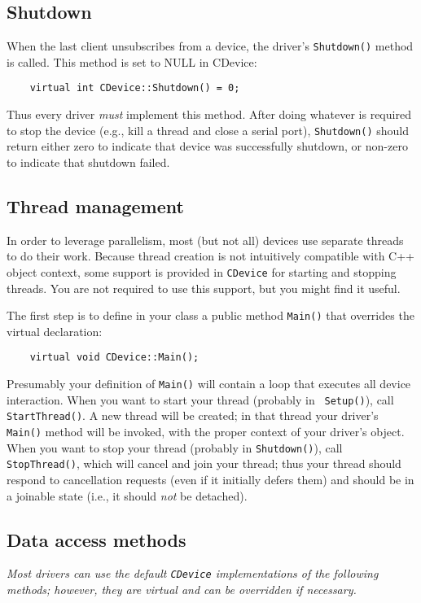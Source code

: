 \documentclass[11pt]{report}
\begin{document}
\subsection{Shutdown}
When the last client unsubscribes from a device, the driver's 
{\tt Shutdown()} method is called.  This method is set to NULL in CDevice:
\begin{verbatim}
    virtual int CDevice::Shutdown() = 0;
\end{verbatim}
Thus every driver {\em must} implement this method.  After doing whatever
is required to stop the device (e.g., kill a thread and close a serial
port), {\tt Shutdown()} should return either zero to indicate that device was
successfully shutdown, or non-zero to indicate that shutdown failed.

\subsection{Thread management}
In order to leverage parallelism, most (but not all) devices use separate
threads to do their work.  Because thread creation is not intuitively
compatible with C++ object context, some support is provided in {\tt CDevice}
for starting and stopping threads.  You are not required to use this support,
but you might find it useful.

The first step is to define in your class a public method {\tt Main()} that
overrides the virtual declaration:
\begin{verbatim}
    virtual void CDevice::Main();
\end{verbatim}
Presumably your definition of {\tt Main()} will contain a loop that executes
all device interaction.  When you want to start your thread (probably in {\tt
Setup()}), call {\tt StartThread()}.  A new thread will be created;
in that thread your driver's {\tt Main()} method will be invoked, with the
proper context of your driver's object.  When you want to stop your thread
(probably in {\tt Shutdown()}), call {\tt StopThread()}, which will cancel and
join your thread; thus your thread should respond to cancellation requests
(even if it initially defers them) and should be in a joinable state (i.e., it
should {\em not} be detached).

\subsection{Data access methods}
{\em Most drivers can use the default {\tt CDevice} implementations of the
following methods; however, they are virtual and can be overridden if
necessary.}
\end{document}
